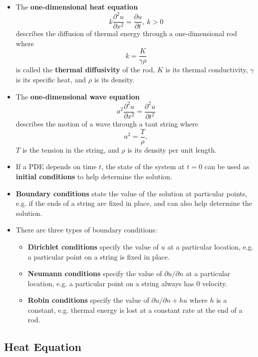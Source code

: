 \documentclass{article}
\begin{document}
\begin{itemize}
  \item The \textbf{one-dimensional heat equation} \[k \frac{\partial^2 u}{\partial x^2} = \frac{\partial u}{\partial t},\ k > 0\] describes the diffusion of thermal energy through a one-dimensional rod where \[k = \frac{K}{\gamma \rho}\] is called the \textbf{thermal diffusivity} of the rod, $K$ is its thermal conductivity, $\gamma$ is its specific heat, and $\rho$ is its density.

  \item The \textbf{one-dimensional wave equation} \[a^2 \frac{\partial^2 u}{\partial x^2} = \frac{\partial^2 u}{\partial t^2}\] describes the motion of a wave through a taut string where \[a^2 = \frac{T}{\rho},\] $T$ is the tension in the string, and $\rho$ is its density per unit length.

  \item If a PDE depends on time $t$, the state of the system at $t = 0$ can be used as \textbf{initial conditions} to help determine the solution.

  \item \textbf{Boundary conditions} state the value of the solution at particular points, e.g. if the ends of a string are fixed in place, and can also help determine the solution.

  \item There are three types of boundary conditions:

        \begin{itemize}
          \item \textbf{Dirichlet conditions} specify the value of $u$ at a particular location, e.g. a particular point on a string is fixed in place.

          \item \textbf{Neumann conditions} specify the value of $\partial u / \partial n$ at a particular location, e.g. a particular point on a string always has $0$ velocity.

          \item \textbf{Robin conditions} specify the value of $\partial u / \partial n + h u$ where $h$ is a constant, e.g. thermal energy is lost at a constant rate at the end of a rod.
        \end{itemize}
\end{itemize}

\subsection{Heat Equation}
\end{document}

